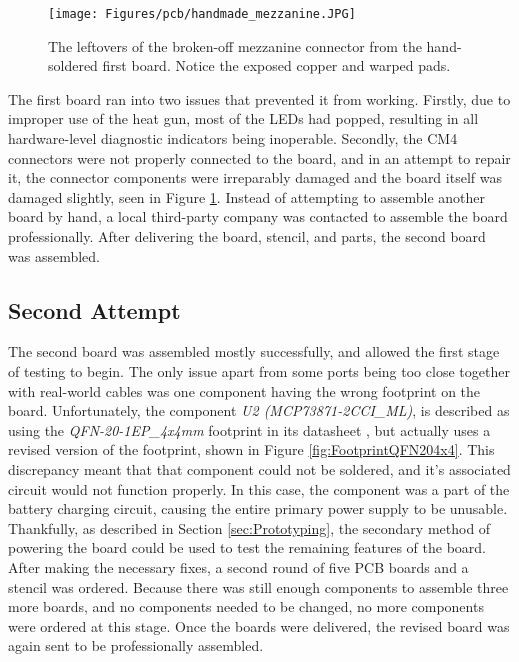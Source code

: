 \begin{figure}[t]
  \centering
  \texttt{[image: Figures/pcb/handmade\_mezzanine.JPG]}
  \caption[Hand-soldered mezzanine connector]{The leftovers of the broken-off mezzanine connector from the hand-soldered first board. Notice the exposed copper and warped pads.}
  \label{fig:brokenmezzanine}
\end{figure}

The first board ran into two issues that prevented it from working.
Firstly, due to improper use of the heat gun, most of the LEDs had popped, resulting in all hardware-level diagnostic indicators being inoperable.
Secondly, the CM4 connectors were not properly connected to the board, and in an attempt to repair it, the connector components were irreparably damaged and the board itself was damaged slightly, seen in Figure \ref{fig:brokenmezzanine}.
Instead of attempting to assemble another board by hand, a local third-party company was contacted to assemble the board professionally.
After delivering the board, stencil, and parts, the second board was assembled.

\subsection{Second Attempt}\label{subsec:Manufacturing2}

The second board was assembled mostly successfully, and allowed the first stage of testing to begin.
The only issue apart from some ports being too close together with real-world cables was one component having the wrong footprint on the board.
Unfortunately, the component \emph{U2 (MCP73871-2CCI\_ML)}, is described as using the \emph{QFN-20-1EP\_4x4mm} footprint in its datasheet \cite{MCP73871-2CCI/ML-ND_datasheet}, but actually uses a revised version of the footprint, shown in Figure \ref{fig:FootprintQFN204x4}.
This discrepancy meant that that component could not be soldered, and it's associated circuit would not function properly.
In this case, the component was a part of the battery charging circuit, causing the entire primary power supply to be unusable.
Thankfully, as described in Section \ref{sec:Prototyping}, the secondary method of powering the board could be used to test the remaining features of the board.
After making the necessary fixes, a second round of five PCB boards and a stencil was ordered.
Because there was still enough components to assemble three more boards, and no components needed to be changed, no more components were ordered at this stage.
Once the boards were delivered, the revised board was again sent to be professionally assembled.

